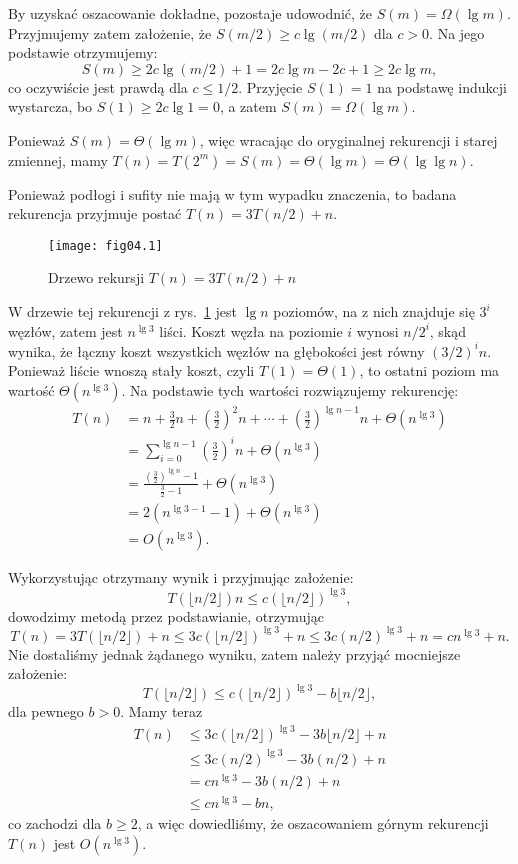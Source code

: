 By uzyskać oszacowanie dokładne, pozostaje udowodnić, że $S(m)=\Omega(\lg m)$. Przyjmujemy zatem założenie, że $S(m/2)\ge c\lg(m/2)$ dla $c>0$. Na jego podstawie otrzymujemy:
\[
	S(m) \ge 2c\lg(m/2)+1 = 2c\lg m-2c+1 \ge 2c\lg m,
\]
co oczywiście jest prawdą dla $c\le1/2$. Przyjęcie $S(1)=1$ na podstawę indukcji wystarcza, bo $S(1)\ge2c\lg1=0$, a zatem $S(m)=\Omega(\lg m)$.

Ponieważ $S(m)=\Theta(\lg m)$, więc wracając do oryginalnej rekurencji i starej zmiennej, mamy $T(n)=T(2^m)=S(m)=\Theta(\lg m)=\Theta(\lg\lg n)$.


\exercise{} %
\noindent Ponieważ podłogi i sufity nie mają w tym wypadku znaczenia, to badana rekurencja przyjmuje postać $T(n)=3T(n/2)+n$.
\begin{figure}[ht]
	\begin{center}
		\texttt{[image: fig04.1]}
	\end{center}
	\caption{Drzewo rekursji $T(n)=3T(n/2)+n$} \label{fig:4.2-1}
\end{figure}
W drzewie tej rekurencji z rys.~\ref{fig:4.2-1} jest $\lg n$ poziomów, na  z nich znajduje się $3^i$ węzłów, zatem jest $n^{\lg3}$ liści. Koszt węzła na poziomie $i$ wynosi $n/2^i$, skąd wynika, że łączny koszt wszystkich węzłów na  głębokości jest równy $(3/2)^in$. Ponieważ liście wnoszą stały koszt, czyli $T(1)=\Theta(1)$, to ostatni poziom ma wartość $\Theta(n^{\lg3})$. Na podstawie tych wartości rozwiązujemy rekurencję:
\begin{align*}
	T(n) &= n+\frac{3}{2}n+\left(\frac{3}{2}\right)^2n+\cdots+\left(\frac{3}{2}\right)^{\lg n-1}n+\Theta(n^{\lg 3}) \\
	&= \sum_{i=0}^{\lg n-1}\left(\frac{3}{2}\right)^in+\Theta(n^{\lg 3}) \\
	&= \frac{\left(\frac{3}{2}\right)^{\lg n}-1}{\frac{3}{2}-1}+\Theta(n^{\lg 3}) \\
	&= 2(n^{\lg 3-1}-1)+\Theta(n^{\lg 3}) \\
	&= O(n^{\lg 3}).
\end{align*}

Wykorzystując otrzymany wynik i przyjmując założenie:
\[
	T(\lfloor n/2\rfloor)n\le c(\lfloor n/2\rfloor)^{\lg 3},
\]
dowodzimy metodą przez podstawianie, otrzymując
\[
	T(n) = 3T(\lfloor n/2\rfloor)+n \le 3c(\lfloor n/2\rfloor)^{\lg 3}+n \le 3c(n/2)^{\lg 3}+n = cn^{\lg 3}+n.
\]
Nie dostaliśmy jednak żądanego wyniku, zatem należy przyjąć mocniejsze założenie:
\[
	T(\lfloor n/2\rfloor) \le c(\lfloor n/2\rfloor)^{\lg 3}-b\lfloor n/2\rfloor,
\]
dla pewnego $b>0$. Mamy teraz
\begin{align*}
	T(n) &\le 3c(\lfloor n/2\rfloor)^{\lg 3}-3b\lfloor n/2\rfloor+n \\
	&\le 3c(n/2)^{\lg 3}-3b(n/2)+n \\
	&= cn^{\lg 3}-3b(n/2)+n \\
	&\le cn^{\lg 3}-bn,
\end{align*}
co zachodzi dla $b\ge2$, a więc dowiedliśmy, że oszacowaniem górnym rekurencji $T(n)$ jest $O(n^{\lg3})$.

